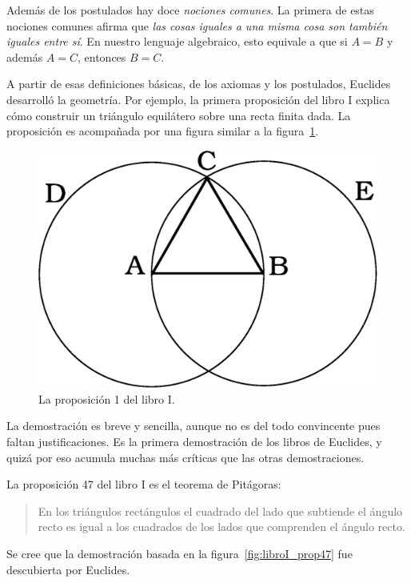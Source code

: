 Además de los postulados hay doce \emph{nociones comunes}. La primera de estas
nociones comunes afirma que \emph{las cosas iguales a una misma cosa son
también iguales entre sí}. En nuestro lenguaje algebraico, esto equivale a que
si $A=B$ y además $A=C$, entonces $B=C$.  

A partir de esas definiciones básicas, de los axiomas y los postulados,
Euclides desarrolló la geometría. Por ejemplo, la primera proposición del libro
I explica cómo construir un triángulo equilátero sobre una recta finita dada.
La proposición es acompañada por una figura similar a la
figura~\ref{fig:libroI_prop1}. 

\begin{figure}
   \centering
   \includegraphics[scale=0.2]{images/libroI_prop1}
   \caption{La proposición 1 del libro I.}
   \label{fig:libroI_prop1}
\end{figure}

La demostración es breve y sencilla, aunque no es del todo convincente pues
faltan justificaciones. Es la primera demostración de los libros de Euclides, y
quizá por eso acumula muchas más críticas que las otras demostraciones.  

La proposición 47 del libro I es el teorema de Pitágoras: 
\begin{quote}
	En los triángulos rectángulos el cuadrado del lado que subtiende el ángulo
	recto es igual a los cuadrados de los lados que comprenden el ángulo recto.
\end{quote}
Se cree que la demostración basada en la figura~\ref{fig:libroI_prop47} fue
descubierta por Euclides.


